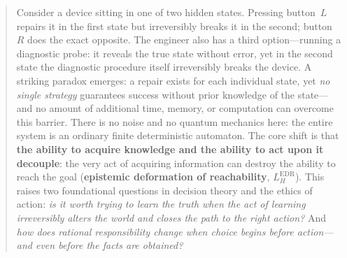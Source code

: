 \documentclass[10pt,a4paper]{article}
\theoremstyle{cleanthm}
\theoremstyle{cleandef}
\begin{document}
\begin{abstract}
\noindent
Consider a device sitting in one of two hidden states. Pressing button~$L$ repairs it in the first state but irreversibly breaks it in the second; button~$R$ does the exact opposite. The engineer also has a third option—running a diagnostic probe: it reveals the true state without error, yet in the second state the diagnostic procedure itself irreversibly breaks the device. A striking paradox emerges: a repair exists for each individual state, yet \emph{no single strategy} guarantees success without prior knowledge of the state—and no amount of additional time, memory, or computation can overcome this barrier. There is no noise and no quantum mechanics here: the entire system is an ordinary finite deterministic automaton. The core shift is that \textbf{the ability to acquire knowledge and the ability to act upon it decouple}: the very act of acquiring information can destroy the ability to reach the goal (\textbf{epistemic deformation of reachability}, $L_H^{\mathrm{EDR}}$). This raises two foundational questions in decision theory and the ethics of action: \emph{is it worth trying to learn the truth when the act of learning irreversibly alters the world and closes the path to the right action?} And \emph{how does rational responsibility change when choice begins before action—and even before the facts are obtained?}


\end{abstract}
\end{document}
